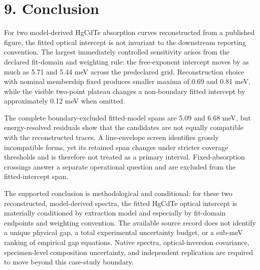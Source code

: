 \section{9. Conclusion}\label{conclusion}

For two model-derived HgCdTe absorption curves reconstructed from a
published figure, the fitted optical intercept is not invariant to the
downstream reporting convention. The largest immediately controlled
sensitivity arises from the declared fit-domain and weighting rule: the
free-exponent intercept moves by as much as 5.71 and 5.44 meV across the
predeclared grid. Reconstruction choice with nominal membership fixed
produces smaller maxima of 0.69 and 0.81 meV, while the visible
two-point plateau changes a non-boundary fitted intercept by
approximately 0.12 meV when omitted.

The complete boundary-excluded fitted-model spans are 5.09 and 6.68 meV,
but energy-resolved residuals show that the candidates are not equally
compatible with the reconstructed traces. A line-envelope screen
identifies grossly incompatible forms, yet its retained span changes
under stricter coverage thresholds and is therefore not treated as a
primary interval. Fixed-absorption crossings answer a separate
operational question and are excluded from the fitted-intercept span.

The supported conclusion is methodological and conditional: for these
two reconstructed, model-derived spectra, the fitted HgCdTe optical
intercept is materially conditioned by extraction model and especially
by fit-domain endpoints and weighting convention. The available source
record does not identify a unique physical gap, a total experimental
uncertainty budget, or a sub-meV ranking of empirical gap equations.
Native spectra, optical-inversion covariance, specimen-level composition
uncertainty, and independent replication are required to move beyond
this case-study boundary.
